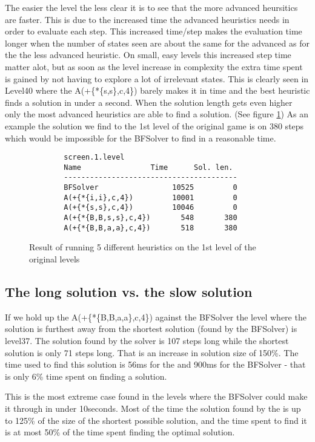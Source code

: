 The easier the level the less clear it is to see that the more advanced heursitics are faster. This is due to the increased time the advanced heuristics needs in order to evaluate each step. This increased time/step makes the evaluation time longer when the number of states seen are about the same for the advanced as for the the less advanced heuristic. On small, easy levels this increased step time matter alot, but as soon as the level increase in complexity the extra time spent is gained by not having to explore a lot of irrelevant states. This is clearly seen in Level40 where the A(+\{*\{s,s\},c,4\}) barely makes it in time and the best heuristic finds a solution in under a second. When the solution length gets even higher only the most advanced heuristics are able to find a solution. (See figure \ref{fig:std1solution}) As an example the solution we find to the 1st level of the original game is on 380 steps which would be impossible for the BFSolver to find in a reasonable time.
\begin{figure}[htp]
\begin{verbatim}
		screen.1.level
		Name                Time      Sol. len. 
		----------------------------------------
		BFSolver                 10525         0
		A(+{*{i,i},c,4})         10001         0
		A(+{*{s,s},c,4})         10046         0
		A(+{*{B,B,s,s},c,4})       548       380
		A(+{*{B,B,a,a},c,4})       518       380
\end{verbatim}
	\caption{Result of running 5 different heuristics on the 1st level of the original levels}
	\label{fig:std1solution}
\end{figure}

\subsection{The long solution vs. the slow solution}
If we hold up the A(+\{*\{B,B,a,a\},c,4\}) against the BFSolver the level where the \astar solution is furthest away from the shortest solution (found by the BFSolver) is level37. The solution found by the \astar solver is 107 steps long while the shortest solution is only 71 steps long. That is an increase in solution size of 150\%.
The time used to find this solution is 56ms for the \astar and 900ms for the BFSolver - that is only 6\% time spent on finding a solution.

This is the most extreme case found in the levels where the BFSolver could make it through in under 10seconds. Most of the time the solution found by the \astar is up to 125\% of the size of the shortest possible solution, and the time spent to find it is at most 50\% of the time spent finding the optimal solution.


